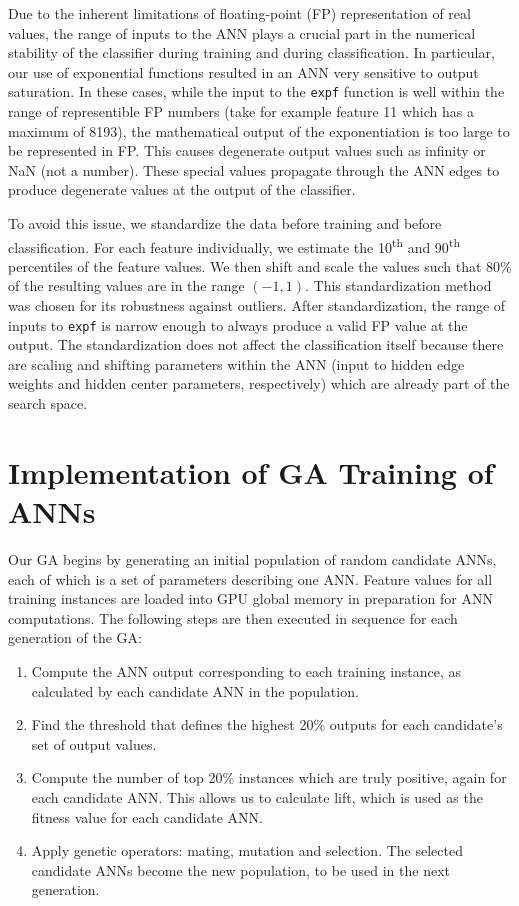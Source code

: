 \documentclass[11pt]{article}       %
\begin{document}
Due to the inherent limitations of floating-point (FP) representation of real values, the range of inputs to the ANN plays a crucial part in the numerical stability of the classifier during training and during classification. In particular, our use of exponential functions resulted in an ANN very sensitive to output saturation. In these cases, while the input to the \texttt{expf} function is well within the range of representible FP numbers (take for example feature 11 which has a maximum of 8193), the mathematical output of the exponentiation is too large to be represented in FP. This causes degenerate output values such as infinity or NaN (not a number). These special values propagate through the ANN edges to produce degenerate values at the output of the classifier.

To avoid this issue, we standardize the data before training and before classification. For each feature individually, we estimate the 10\textsuperscript{th} and 90\textsuperscript{th} percentiles of the feature values. We then shift and scale the values such that 80\% of the resulting values are in the range $(-1, 1)$. This standardization method was chosen for its robustness against outliers. After standardization, the range of inputs to \texttt{expf} is narrow enough to always produce a valid FP value at the output. The standardization does not affect the classification itself because there are scaling and shifting parameters within the ANN (input to hidden edge weights and hidden center parameters, respectively) which are already part of the search space.

\section{Implementation of GA Training of ANNs} \label{algimp}

Our GA begins by generating an initial population of random candidate ANNs, each of which is a set of parameters describing one ANN. Feature values for all training instances are loaded into GPU global memory in preparation for ANN computations. The following steps are then executed in sequence for each generation of the GA:

\begin{enumerate}
	\item Compute the ANN output corresponding to each training instance, as calculated by each candidate ANN in the population.
	\item Find the threshold that defines the highest 20\% outputs for each candidate's set of output values.
	\item Compute the number of top 20\% instances which are truly positive, again for each candidate ANN. This allows us to calculate lift, which is used as the fitness value for each candidate ANN.
	\item Apply genetic operators: mating, mutation and selection. The selected candidate ANNs become the new population, to be used in the next generation.
\end{enumerate}
\end{document}
